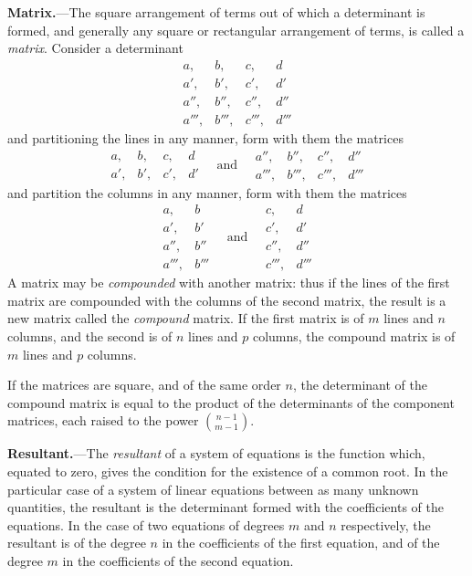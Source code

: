 \documentclass[12pt,a4paper]{article}
\theoremstyle{definition}
\begin{document}
\vspace{1em}

\noindent\textbf{Matrix.}---The square arrangement of terms out of which a determinant is formed, and generally any square or rectangular arrangement of terms, is called a \textit{matrix}. Consider a determinant
\[
\begin{array}{cccc}
a, & b, & c, & d \\
a', & b', & c', & d' \\
a'', & b'', & c'', & d'' \\
a''', & b''', & c''', & d'''
\end{array}
\]
and partitioning the lines in any manner, form with them the matrices
\[
\begin{array}{cccc}
a, & b, & c, & d \\
a', & b', & c', & d'
\end{array}
\quad\text{and}\quad
\begin{array}{cccc}
a'', & b'', & c'', & d'' \\
a''', & b''', & c''', & d'''
\end{array}
\]
and partition the columns in any manner, form with them the matrices
\[
\begin{array}{cc}
a, & b \\
a', & b' \\
a'', & b'' \\
a''', & b'''
\end{array}
\quad\text{and}\quad
\begin{array}{cc}
c, & d \\
c', & d' \\
c'', & d'' \\
c''', & d'''
\end{array}
\]
A matrix may be \textit{compounded} with another matrix: thus if the lines of the first matrix are compounded with the columns of the second matrix, the result is a new matrix called the \textit{compound} matrix. If the first matrix is of $m$ lines and $n$ columns, and the second is of $n$ lines and $p$ columns, the compound matrix is of $m$ lines and $p$ columns.

If the matrices are square, and of the same order $n$, the determinant of the compound matrix is equal to the product of the determinants of the component matrices, each raised to the power $\binom{n-1}{m-1}$.

\vspace{1em}

\noindent\textbf{Resultant.}---The \textit{resultant} of a system of equations is the function which, equated to zero, gives the condition for the existence of a common root. In the particular case of a system of linear equations between as many unknown quantities, the resultant is the determinant formed with the coefficients of the equations. In the case of two equations of degrees $m$ and $n$ respectively, the resultant is of the degree $n$ in the coefficients of the first equation, and of the degree $m$ in the coefficients of the second equation.
\end{document}
